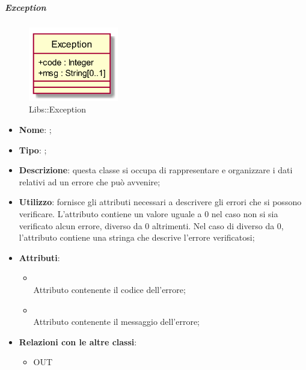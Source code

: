 \hypertarget{Exception_label}{\subparagraph{Exception}}
\begin{figure}[h]
	\centering
	\includegraphics[width=0.35\textwidth,height=\textheight,keepaspectratio]{images/ClassException.png}
	\caption{Libs::Exception}
\end{figure}
\begin{itemize}
	\item \textbf{Nome}: ;
	\item \textbf{Tipo}: ;
	\item \textbf{Descrizione}: questa classe si occupa di rappresentare e organizzare i dati relativi ad un errore che può avvenire;
	\item \textbf{Utilizzo}: fornisce gli attributi necessari a descrivere gli errori che si possono verificare.
	L'attributo  contiene un valore uguale a 0 nel caso non si sia verificato alcun errore, diverso da 0 altrimenti.
	Nel caso di  diverso da 0, l'attributo  contiene una stringa che descrive l'errore verificatosi;
	\item \textbf{Attributi}:
	\begin{itemize}
		\item[]  \\
		Attributo contenente il codice dell'errore;
		\item[]  \\
		Attributo contenente il messaggio dell'errore;
	\end{itemize}
	\item \textbf{Relazioni con le altre classi}:
	\begin{itemize}
		\item OUT \hyperlink{ErrorSubject_label}{}
	\end{itemize}
\end{itemize}
\FloatBarrier

